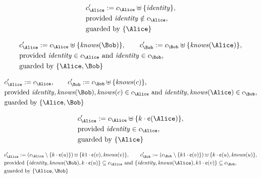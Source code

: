 \begin{align*}
&
c'_
{
\Alice
}
 := 
c_
{
\Alice
}
 \uplus 
\{
\mathit{
identity
}
\}
,\\
&
\text{provided } 
\mathit{
identity
}
 \notin c_
{
\Alice
}
,\\
&
\text{guarded by } \{
\Alice
\}
\end{align*}

\begin{align*}
&
c'_
{
\Alice
}
 := 
c_
{
\Alice
}
 \uplus 
\{
\mathit{
knows
}
(
\Bob
)
\}
, \qquad 
c'_
{
\Bob
}
 := 
c_
{
\Bob
}
 \uplus 
\{
\mathit{
knows
}
(
\Alice
)
\}
,\\
&
\text{provided } 
\mathit{
identity
}
 \in c_
{
\Alice
}
 \text{ and } 
\mathit{
identity
}
 \in c_
{
\Bob
}
,\\
&
\text{guarded by } \{
\Alice
,
\Bob
\}
\end{align*}

\begin{align*}
&
c'_
{
\Alice
}
 := 
c_
{
\Alice
}
, \qquad 
c'_
{
\Bob
}
 := 
c_
{
\Bob
}
 \uplus 
\{
\mathit{
knows
}
(
c
)
\}
,\\
&
\text{provided } 
\mathit{
identity
}
,
\mathit{
knows
}
(
\Bob
)
,
\mathit{
knows
}
(
c
)
 \in c_
{
\Alice
}
 \text{ and } 
\mathit{
identity
}
,
\mathit{
knows
}
(
\Alice
)
 \in c_
{
\Bob
}
,\\
&
\text{guarded by } \{
\Alice
,
\Bob
\}
\end{align*}

\begin{align*}
&
c'_
{
\Alice
}
 := 
c_
{
\Alice
}
 \uplus 
\{
k
\cdot
\text{\textcent}
(
\Alice
)
\}
,\\
&
\text{provided } 
\mathit{
identity
}
 \in c_
{
\Alice
}
,\\
&
\text{guarded by } \{
\Alice
\}
\end{align*}

\begin{align*}
&
c'_
{
\Alice
}
 := 
(c_
{
\Alice
}
 \setminus 
\{
k
\cdot
\text{\textcent}
(
u
)
\}
) \uplus 
\{
k1
\cdot
\text{\textcent}
(
v
)
,
\mathit{
knows
}
(
v
)
\}
, \qquad 
c'_
{
\Bob
}
 := 
(c_
{
\Bob
}
 \setminus 
\{
k1
\cdot
\text{\textcent}
(
v
)
\}
) \uplus 
\{
k
\cdot
\text{\textcent}
(
u
)
,
\mathit{
knows
}
(
u
)
\}
,\\
&
\text{provided } 
\{
\mathit{
identity
}
,
\mathit{
knows
}
(
\Bob
)
,
k
\cdot
\text{\textcent}
(
u
)
\}
 \subseteq c_
{
\Alice
}
 \text{ and } 
\{
\mathit{
identity
}
,
\mathit{
knows
}
(
\Alice
)
,
k1
\cdot
\text{\textcent}
(
v
)
\}
 \subseteq c_
{
\Bob
}
,\\
&
\text{guarded by } \{
\Alice
,
\Bob
\}
\end{align*}
